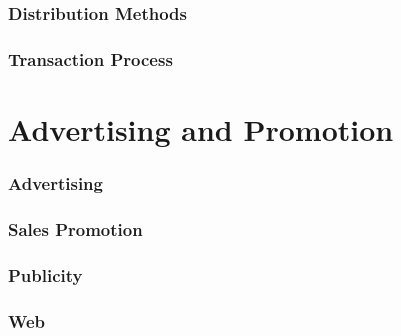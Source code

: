 
\subsubsection{Distribution Methods}


\subsubsection{Transaction Process}


\section{Advertising and Promotion}

\subsubsection{Advertising}


\subsubsection{Sales Promotion}


\subsubsection{Publicity}


\subsubsection{Web}
